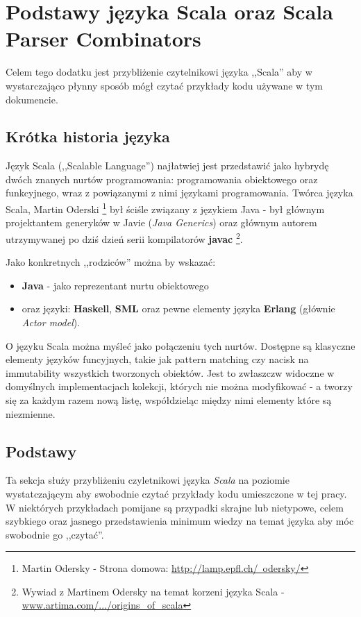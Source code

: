 \chapter{Podstawy języka Scala oraz Scala Parser Combinators}
\label{cha:appendixB}
Celem tego dodatku jest przybliżenie czytelnikowi języka ,,Scala'' aby w wystarczająco płynny sposób mógł czytać przykłady kodu używane w tym dokumencie.

\section{Krótka historia języka}
\label{sec:scala_history}
Język Scala (,,Scalable Language'') najłatwiej jest przedstawić jako hybrydę dwóch znanych nurtów programowania: programowania obiektowego oraz funkcyjnego, wraz z 
powiązanymi z nimi językami programowania. Twórca języka Scala, Martin Oderski \footnote{Martin Odersky - Strona domowa: \href{http://lamp.epfl.ch/~odersky/}{http://lamp.epfl.ch/~odersky/}}
był ściśle związany z językiem Java - był głównym projektantem generyków w Javie (\textit{Java Generics}) oraz głównym autorem utrzymywanej po dziś dzień
serii kompilatorów \textbf{javac} \footnote{Wywiad z Martinem Odersky na temat korzeni języka Scala - \href{http://www.artima.com/scalazine/articles/origins_of_scala.html}{www.artima.com/.../origins\_of\_scala}}.

Jako konkretnych ,,rodziców'' można by wskazać: 
\begin{itemize}
 \item \textbf{Java} - jako reprezentant nurtu obiektowego 
 \item oraz języki: \textbf{Haskell}, \textbf{SML} oraz pewne elementy języka \textbf{Erlang} (głównie \textit{Actor model}).
\end{itemize}

O języku Scala można myśleć jako połączeniu tych nurtów. Dostępne są klasyczne elementy języków funcyjnych,
takie jak pattern matching czy nacisk na immutability wszystkich tworzonych obiektów. Jest to zwłaszczw widoczne w domyślnych implementacjach
kolekcji, których nie można modyfikować - a tworzy się za każdym razem nową listę, współdzieląc między nimi elementy które są niezmienne.

\section{Podstawy}
\label{sec:scala_basics}
Ta sekcja służy przybliżeniu czyletnikowi języka \textit{Scala} na poziomie wystatczającym aby swobodnie czytać przykłady
kodu umieszczone w tej pracy. W niektórych przykładach pomijane są przypadki skrajne lub nietypowe, celem szybkiego oraz 
jasnego przedstawienia minimum wiedzy na temat języka aby móc swobodnie go ,,czytać''.

